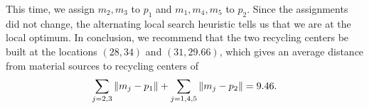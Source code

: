 \documentclass[12pt]{article}
\theoremstyle{definition}
\begin{document}
This time, we assign $m_2, m_3$ to $p_1$ and $m_1, m_4, m_5$ to $p_2$. Since the assignments did not change, the alternating local search heuristic tells us that we are at the local optimum. In conclusion, we recommend that the two recycling centers be built at the locations $(28, 34)$ and $(31, 29.66)$, which gives an average distance from material sources to recycling centers of
\[
    \sum_{j=2,3}\norm{m_j - p_1} + \sum_{j=1,4,5}\norm{m_j - p_2}
        = 9.46.
\]
\end{document}
